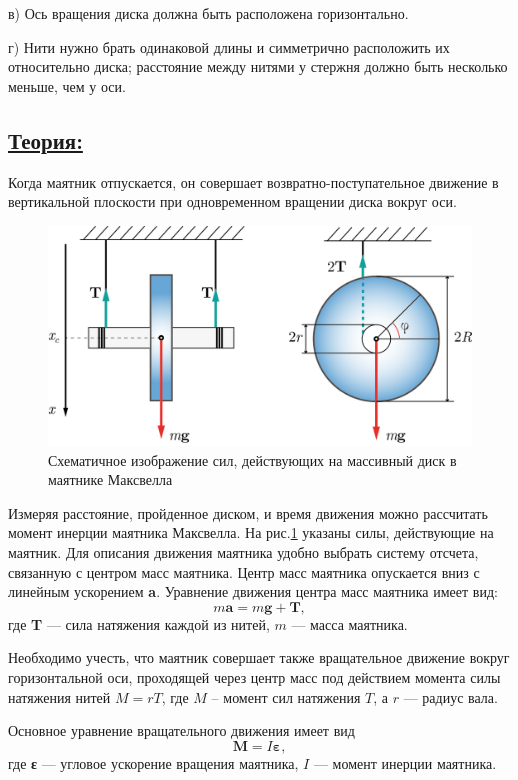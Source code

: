 \documentclass[14pt,a4paper,oneside]{extarticle}	%
\begin{document}
в) Ось вращения диска должна быть расположена горизонтально.

г) Нити нужно брать одинаковой длины и симметрично расположить их относительно диска; расстояние между нитями у стержня должно быть несколько меньше, чем у оси.
	
\subsection*{\underline{Теория:}}
		
	 Когда маятник отпускается, он совершает возвратно-поступательное движение в вертикальной плоскости при одновременном вращении диска вокруг оси.
	
		\begin{figure}[H] 	
		\centering 	
		\includegraphics[width=0.75\linewidth]{Maxwell-3.png}
		\caption{Схематичное изображение сил, действующих на массивный диск в маятнике Максвелла}
		\label{Maxwell-3}
	\end{figure}
	 
	Измеряя расстояние, пройденное диском, и время движения можно рассчитать момент инерции маятника Максвелла.
	На рис.\ref{Maxwell-3} указаны силы, действующие на маятник.
	Для описания движения маятника удобно выбрать систему отсчета, связанную с центром масс маятника.
	Центр масс маятника опускается вниз с линейным ускорением \textbf{a}.
	Уравнение движения центра масс маятника имеет вид:
	\begin{equation}\label{Maxwell-1eq1}
	m\textbf{a} = m\textbf{g} + \textbf{T},
	\end{equation}
	где \textbf{T}  — сила натяжения каждой из нитей, $ m $ — масса маятника.
	
	Необходимо учесть, что маятник совершает также вращательное движение вокруг горизонтальной оси, проходящей через центр масс под действием момента силы натяжения нитей $ M = r T $, где $ M $ – момент сил натяжения $ T $, а $ r $ — радиус вала.
	
	Основное уравнение вращательного движения имеет вид
	\begin{equation}\label{Maxwell-1eq2}
	\textbf{M} = I\textbf{ε},
	\end{equation}
	где \textbf{ε} — угловое ускорение вращения маятника, $ I $ — момент инерции маятника.
	
\end{document}
